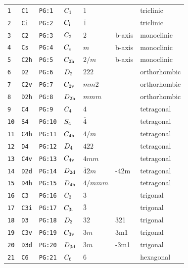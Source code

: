 \documentclass[fleqn,10pt]{jsarticle}
\begin{document}
\begin{center}
\begin{longtable}{lllllll}
\texttt{1} & \texttt{C1} & \texttt{PG:1} & $C_{\rm 1}$ & $1$ &  & triclinic \\
\texttt{2} & \texttt{Ci} & \texttt{PG:2} & $C_{\rm i}$ & $\bar{1}$ &  & triclinic \\ \hline
\texttt{3} & \texttt{C2} & \texttt{PG:3} & $C_{\rm 2}$ & $2$ & b-axis & monoclinic \\
\texttt{4} & \texttt{Cs} & \texttt{PG:4} & $C_{\rm s}$ & $m$ & b-axis & monoclinic \\
\texttt{5} & \texttt{C2h} & \texttt{PG:5} & $C_{\rm 2h}$ & $2/m$ & b-axis & monoclinic \\ \hline
\texttt{6} & \texttt{D2} & \texttt{PG:6} & $D_{\rm 2}$ & $222$ &  & orthorhombic \\
\texttt{7} & \texttt{C2v} & \texttt{PG:7} & $C_{\rm 2v}$ & $mm2$ &  & orthorhombic \\
\texttt{8} & \texttt{D2h} & \texttt{PG:8} & $D_{\rm 2h}$ & $mmm$ &  & orthorhombic \\ \hline
\texttt{9} & \texttt{C4} & \texttt{PG:9} & $C_{\rm 4}$ & $4$ &  & tetragonal \\
\texttt{10} & \texttt{S4} & \texttt{PG:10} & $S_{\rm 4}$ & $\bar{4}$ &  & tetragonal \\
\texttt{11} & \texttt{C4h} & \texttt{PG:11} & $C_{\rm 4h}$ & $4/m$ &  & tetragonal \\
\texttt{12} & \texttt{D4} & \texttt{PG:12} & $D_{\rm 4}$ & $422$ &  & tetragonal \\
\texttt{13} & \texttt{C4v} & \texttt{PG:13} & $C_{\rm 4v}$ & $4mm$ &  & tetragonal \\
\texttt{14} & \texttt{D2d} & \texttt{PG:14} & $D_{\rm 2d}$ & $\bar{4}2m$ & -42m & tetragonal \\
\texttt{15} & \texttt{D4h} & \texttt{PG:15} & $D_{\rm 4h}$ & $4/mmm$ &  & tetragonal \\ \hline
\texttt{16} & \texttt{C3} & \texttt{PG:16} & $C_{\rm 3}$ & $3$ &  & trigonal \\
\texttt{17} & \texttt{C3i} & \texttt{PG:17} & $C_{\rm 3i}$ & $\bar{3}$ &  & trigonal \\
\texttt{18} & \texttt{D3} & \texttt{PG:18} & $D_{\rm 3}$ & $32$ & 321 & trigonal \\
\texttt{19} & \texttt{C3v} & \texttt{PG:19} & $C_{\rm 3v}$ & $3m$ & 3m1 & trigonal \\
\texttt{20} & \texttt{D3d} & \texttt{PG:20} & $D_{\rm 3d}$ & $\bar{3}m$ & -3m1 & trigonal \\ \hline
\texttt{21} & \texttt{C6} & \texttt{PG:21} & $C_{\rm 6}$ & $6$ &  & hexagonal \\

\end{longtable}
\end{center}
\end{document}
